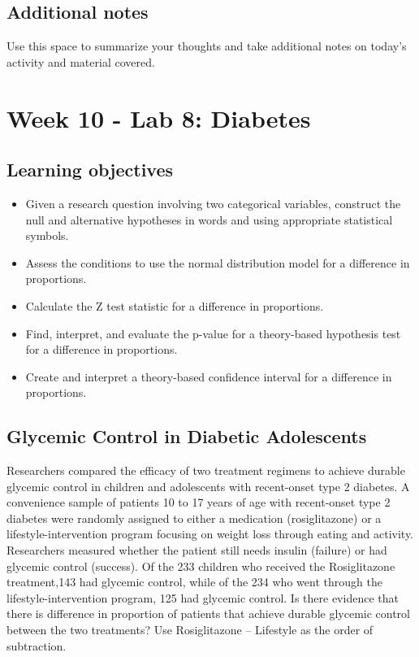 \documentclass[
]{report}
\begin{document}
\hypertarget{additional-notes-17}{%
\subsection{Additional notes}\label{additional-notes-17}}

Use this space to summarize your thoughts and take additional notes on today's activity and material covered.

\newpage

\hypertarget{week-10---lab-8-diabetes}{%
\section{Week 10 - Lab 8: Diabetes}\label{week-10---lab-8-diabetes}}


\hypertarget{learning-objectives-17}{%
\subsection{Learning objectives}\label{learning-objectives-17}}

\begin{itemize}
\item
  Given a research question involving two categorical variables, construct the null and alternative hypotheses
  in words and using appropriate statistical symbols.
\item
  Assess the conditions to use the normal distribution model for a difference in proportions.
\item
  Calculate the Z test statistic for a difference in proportions.
\item
  Find, interpret, and evaluate the p-value for a theory-based hypothesis test for a difference in proportions.
\item
  Create and interpret a theory-based confidence interval for a difference in proportions.
\end{itemize}

\hypertarget{glycemic-control-in-diabetic-adolescents}{%
\subsection{Glycemic Control in Diabetic Adolescents}\label{glycemic-control-in-diabetic-adolescents}}

Researchers compared the efficacy of two treatment regimens to achieve durable glycemic control in children and adolescents with recent-onset type 2 diabetes. A convenience sample of patients 10 to 17 years of age with recent-onset type 2 diabetes were randomly assigned to either a medication (rosiglitazone) or a lifestyle-intervention program focusing on weight loss through eating and activity. Researchers measured whether the patient still needs insulin (failure) or had glycemic control (success). Of the 233 children who received the Rosiglitazone treatment,143 had glycemic control, while of the 234 who went through the lifestyle-intervention program, 125 had glycemic control. Is there evidence that there is difference in proportion of patients that achieve durable glycemic control between the two treatments? Use Rosiglitazone -- Lifestyle as the order of subtraction.
\end{document}
